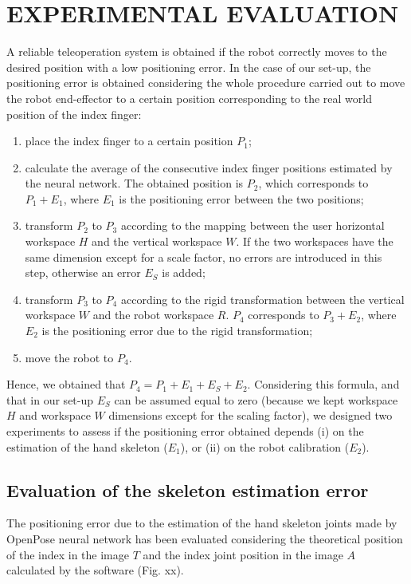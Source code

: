 \documentclass[letterpaper, 10 pt, conference]{ieeeconf}  %
\begin{document}
\section{EXPERIMENTAL EVALUATION}\label{sec:experiments}
A reliable teleoperation system is obtained if the robot correctly moves to the desired position with a low positioning error. In the case of our set-up, the positioning error is obtained considering the whole procedure carried out to move the robot end-effector to a certain position corresponding to the real world position of the index finger:
\begin{enumerate}
\item place the index finger to a certain position $P_1$;
\item calculate the average of the consecutive index finger positions estimated by the neural network. The obtained position is $P_2$, which corresponds to $P_1 + E_1$, where $E_1$ is the positioning error between the two positions;
\item transform $P_2$ to $P_3$ according to the mapping between the user horizontal workspace $H$ and the vertical workspace $W$. If the two workspaces have the same dimension except for a scale factor, no errors are introduced in this step, otherwise an error $E_S$ is added;
\item transform $P_3$ to $P_4$ according to the rigid transformation between the vertical workspace $W$ and the robot workspace $R$. $P_4$ corresponds to $P_3 + E_2$, where $E_2$ is the positioning error due to the rigid transformation;
\item move the robot to $P_4$.
\end{enumerate}

Hence, we obtained that $P_4 = P_1 + E_1 + E_S + E_2$.
Considering this formula, and that in our set-up $E_S$ can be assumed equal to zero (because we kept workspace $H$ and workspace $W$ dimensions except for the scaling factor), we designed two experiments to assess if the positioning error obtained depends (i) on the estimation of the hand skeleton ($E_1$), or (ii) on the robot calibration ($E_2$).

\subsection{Evaluation of the skeleton estimation error}
The positioning error due to the estimation of the hand skeleton joints made by OpenPose neural network has been evaluated considering the theoretical position of the index in the image $T$ and the index joint position in the image $A$ calculated by the software (Fig. xx).
\end{document}
